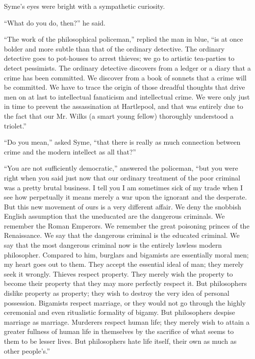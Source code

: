 \documentclass{book}
\begin{document}
Syme’s eyes were bright with a sympathetic curiosity.

“What do you do, then?” he said.

“The work of the philosophical policeman,” replied the man in blue, “is at once bolder and more subtle than that of the ordinary detective. The ordinary detective goes to pot-houses to arrest thieves; we go to artistic tea-parties to detect pessimists. The ordinary detective discovers from a ledger or a diary that a crime has been committed. We discover from a book of sonnets that a crime will be committed. We have to trace the origin of those dreadful thoughts that drive men on at last to intellectual fanaticism and intellectual crime. We were only just in time to prevent the assassination at Hartlepool, and that was entirely due to the fact that our Mr. Wilks (a smart young fellow) thoroughly understood a triolet.”

“Do you mean,” asked Syme, “that there is really as much connection between crime and the modern intellect as all that?”

“You are not sufficiently democratic,” answered the policeman, “but you were right when you said just now that our ordinary treatment of the poor criminal was a pretty brutal business. I tell you I am sometimes sick of my trade when I see how perpetually it means merely a war upon the ignorant and the desperate. But this new movement of ours is a very different affair. We deny the snobbish English assumption that the uneducated are the dangerous criminals. We remember the Roman Emperors. We remember the great poisoning princes of the Renaissance. We say that the dangerous criminal is the educated criminal. We say that the most dangerous criminal now is the entirely lawless modern philosopher. Compared to him, burglars and bigamists are essentially moral men; my heart goes out to them. They accept the essential ideal of man; they merely seek it wrongly. Thieves respect property. They merely wish the property to become their property that they may more perfectly respect it. But philosophers dislike property as property; they wish to destroy the very idea of personal possession. Bigamists respect marriage, or they would not go through the highly ceremonial and even ritualistic formality of bigamy. But philosophers despise marriage as marriage. Murderers respect human life; they merely wish to attain a greater fullness of human life in themselves by the sacrifice of what seems to them to be lesser lives. But philosophers hate life itself, their own as much as other people’s.”
\end{document}
